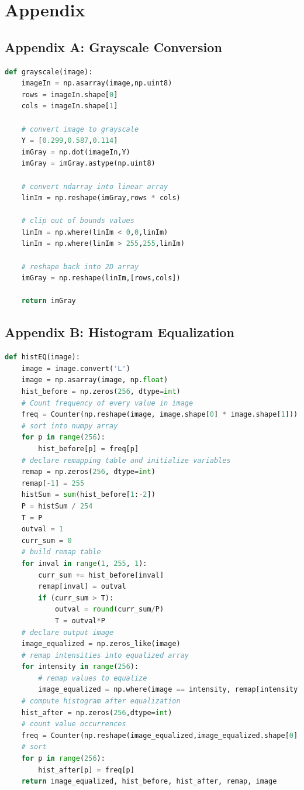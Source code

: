 \documentclass[11pt,a4paper]{article}
\begin{document}
\pagebreak

\section{Appendix}
	
\subsection{Appendix A: Grayscale Conversion} \label{app:gray}
	\begin{lstlisting}[language=Python,label={lst:gray}]
def grayscale(image):
    imageIn = np.asarray(image,np.uint8)
    rows = imageIn.shape[0]
    cols = imageIn.shape[1]

    # convert image to grayscale
    Y = [0.299,0.587,0.114]
    imGray = np.dot(imageIn,Y)
    imGray = imGray.astype(np.uint8)

    # convert ndarray into linear array
    linIm = np.reshape(imGray,rows * cols)

    # clip out of bounds values
    linIm = np.where(linIm < 0,0,linIm)
    linIm = np.where(linIm > 255,255,linIm)

    # reshape back into 2D array
    imGray = np.reshape(linIm,[rows,cols])

    return imGray
	\end{lstlisting}
	
\pagebreak
	
\subsection{Appendix B: Histogram Equalization} \label{app:hist}
	\begin{lstlisting}[language=Python,label={lst:hist}]
def histEQ(image):
    image = image.convert('L')
    image = np.asarray(image, np.float)
    hist_before = np.zeros(256, dtype=int)
    # Count frequency of every value in image
    freq = Counter(np.reshape(image, image.shape[0] * image.shape[1]))
    # sort into numpy array
    for p in range(256):
        hist_before[p] = freq[p]
    # declare remapping table and initialize variables
    remap = np.zeros(256, dtype=int)
    remap[-1] = 255
    histSum = sum(hist_before[1:-2])
    P = histSum / 254
    T = P
    outval = 1
    curr_sum = 0
    # build remap table
    for inval in range(1, 255, 1):
        curr_sum += hist_before[inval]
        remap[inval] = outval
        if (curr_sum > T):
            outval = round(curr_sum/P)
            T = outval*P
    # declare output image
    image_equalized = np.zeros_like(image)
    # remap intensities into equalized array
    for intensity in range(256):
        # remap values to equalize
        image_equalized = np.where(image == intensity, remap[intensity], image_equalized)
    # compute histogram after equalization
    hist_after = np.zeros(256,dtype=int)
    # count value occurrences
    freq = Counter(np.reshape(image_equalized,image_equalized.shape[0] * image_equalized.shape[1]))
    # sort
    for p in range(256):
        hist_after[p] = freq[p]
    return image_equalized, hist_before, hist_after, remap, image
    \end{lstlisting}
    
\end{document}
